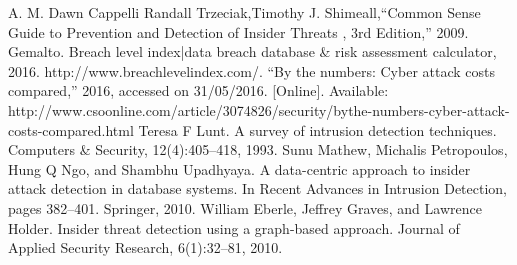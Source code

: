 \documentclass[conference]{IEEEtran}
\begin{document}
\begin{thebibliography}{00}
A. M. Dawn Cappelli Randall Trzeciak,Timothy J. Shimeall,“Common Sense Guide to Prevention and Detection of Insider
Threats , 3rd Edition,” 2009.
 Gemalto. Breach level index|data breach database \& risk assessment calculator, 2016. http://www.breachlevelindex.com/.
 “By the numbers: Cyber attack costs compared,” 2016, accessed on 31/05/2016. [Online]. Available: http://www.csoonline.com/article/3074826/security/bythe-numbers-cyber-attack-costs-compared.html
 Teresa F Lunt. A survey of intrusion detection techniques. Computers \& Security, 12(4):405–418, 1993.
 Sunu Mathew, Michalis Petropoulos, Hung Q Ngo, and Shambhu Upadhyaya. A data-centric approach to insider attack detection in database systems. In Recent Advances in Intrusion Detection, pages 382–401. Springer, 2010.
 William Eberle, Jeffrey Graves, and Lawrence Holder. Insider threat detection using a graph-based approach. Journal of Applied Security Research, 6(1):32–81, 2010.


\end{thebibliography}
\end{document}
